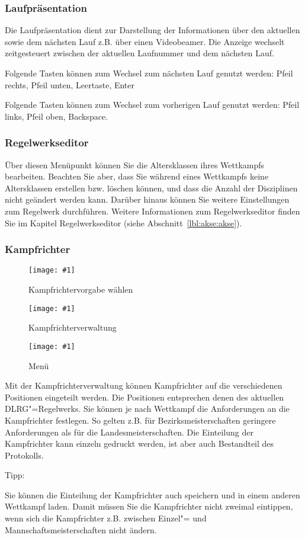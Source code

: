 \documentclass[11pt,a4paper,twoside,ngerman]{article}
\newcommand{\hsmimage}[3]{\begin{figure}[!ht]\centering\texttt{[image: \#1]}\caption{#3}\end{figure}}
\begin{document}
\subsubsection*{Laufpräsentation}
Die Laufpräsentation dient zur Darstellung der Informationen über den aktuellen sowie dem nächsten Lauf z.B. über einen Videobeamer. Die Anzeige wechselt zeitgesteuert zwischen der aktuellen Laufnummer und dem nächsten Lauf.

Folgende Tasten können zum Wechsel zum nächsten Lauf genutzt werden: Pfeil rechts, Pfeil unten, Leertaste, Enter

Folgende Tasten können zum Wechsel zum vorherigen Lauf genutzt werden: Pfeil links, Pfeil oben, Backspace.


\subsubsection*{Regelwerkseditor}
Über diesen Menüpunkt können Sie die Altersklassen ihres Wettkampfs bearbeiten. Beachten Sie aber, dass Sie während eines Wettkampfs keine Altersklassen erstellen bzw. löschen können, und dass die Anzahl der Disziplinen nicht geändert werden kann. Darüber hinaus können Sie weitere Einstellungen zum Regelwerk durchführen. Weitere Informationen zum Regelwerkseditor finden Sie im Kapitel Regelwerkseditor (siehe Abschnitt~\ref{lbl:akse:akse}). 


\subsubsection*{Kampfrichter}

\hsmimage{pics/kampfrichter-neu}{.66\textwidth}{Kampfrichtervorgabe wählen}

\hsmimage{pics/kampfrichter}{.73\textwidth}{Kampfrichterverwaltung}

\hsmimage{pics/kampfrichter-menu}{.15\textwidth}{Menü}
Mit der Kampfrichterverwaltung können Kampfrichter auf die verschiedenen Positionen eingeteilt werden. Die Positionen entsprechen denen des aktuellen DLRG"=Regelwerks. Sie können je nach Wettkampf die Anforderungen an die Kampfrichter festlegen. So gelten z.B. für Bezirksmeisterschaften geringere Anforderungen als für die Landesmeisterschaften. Die Einteilung der Kampfrichter kann einzeln gedruckt werden, ist aber auch Bestandteil des Protokolls.

\begin{bfseries}Tipp:\end{bfseries} Sie können die Einteilung der Kampfrichter auch speichern und in einem anderen Wettkampf laden. Damit müssen Sie die Kampfrichter nicht zweimal eintippen, wenn sich die Kampfrichter z.B. zwischen Einzel"= und Mannschaftsmeisterschaften nicht ändern.
\end{document}
